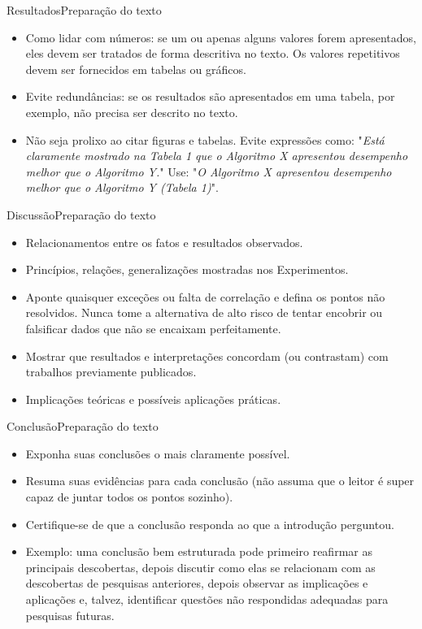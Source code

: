 \documentclass[t]{beamer}
\begin{document}
\begin{ftst}{Resultados}{Preparação do texto}
\justifying
\begin{itemize}
    \item Como lidar com números: se um ou apenas alguns valores forem apresentados, eles devem ser tratados de forma descritiva no texto. Os valores repetitivos devem ser fornecidos em tabelas ou gráficos.
    \vone
    \item Evite redundâncias: se os resultados são apresentados em uma tabela, por exemplo, não precisa ser descrito no texto.
    \vone
    \item Não seja prolixo ao citar figuras e tabelas. Evite expressões como: "\textit{Está claramente mostrado na Tabela 1 que o Algoritmo X apresentou desempenho melhor que o Algoritmo Y.}" Use: "\textit{O Algoritmo X apresentou desempenho melhor que o Algoritmo Y (Tabela 1)}".
\end{itemize}

\end{ftst}


\begin{ftst}{Discussão}{Preparação do texto}
\justifying
\begin{itemize}
    \item Relacionamentos entre os fatos e resultados observados.
    \vone
    \item Princípios, relações, generalizações mostradas nos Experimentos. 
    \vone
    \item Aponte quaisquer exceções ou falta de correlação e defina os pontos não resolvidos. Nunca tome a alternativa de alto risco de tentar encobrir ou falsificar dados que não se encaixam perfeitamente.
    \vone
    \item Mostrar que resultados e interpretações concordam (ou contrastam) com trabalhos previamente publicados.
    \vone
    \item Implicações teóricas e possíveis aplicações práticas.
\end{itemize}

\end{ftst}


\begin{ftst}{Conclusão}{Preparação do texto}
\justifying
\begin{itemize}
    \item Exponha suas conclusões o mais claramente possível.
    \vone
    \item Resuma suas evidências para cada conclusão  (não assuma que o leitor é super capaz de juntar todos os pontos sozinho).
    \vone
    \item Certifique-se de que a conclusão responda ao que a introdução perguntou.
    \vone
    \item Exemplo: uma conclusão bem estruturada pode primeiro reafirmar as principais descobertas, depois discutir como elas se relacionam com as descobertas de pesquisas anteriores, depois observar as implicações e aplicações e, talvez, identificar questões não respondidas adequadas para pesquisas futuras.
\end{itemize}

\end{ftst}
\end{document}
